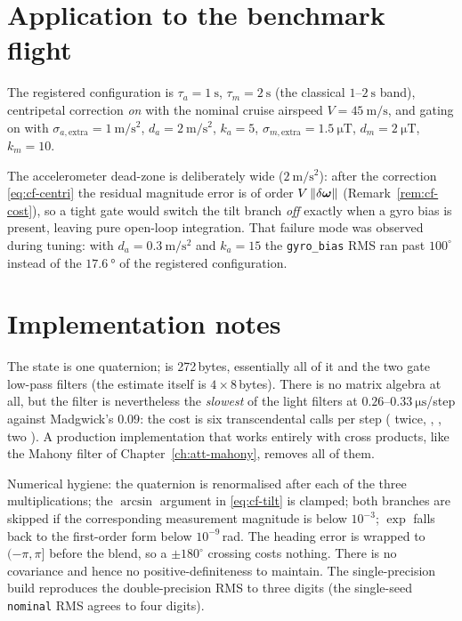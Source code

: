 \section{Application to the benchmark flight}
The registered configuration is $\tau_a=\SI{1}{\second}$, $\tau_m=\SI{2}{\second}$ (the classical
$1$--$\SI{2}{\second}$ band), centripetal correction \emph{on} with the nominal cruise airspeed
$V=\SI{45}{\metre\per\second}$, and gating on with
$\sigma_{a,\text{extra}}=\SI{1}{\metre\per\second\squared}$, $d_a=\SI{2}{\metre\per\second\squared}$,
$k_a=5$, $\sigma_{m,\text{extra}}=\SI{1.5}{\micro\tesla}$, $d_m=\SI{2}{\micro\tesla}$, $k_m=10$.

The accelerometer dead-zone is deliberately wide ($\SI{2}{\metre\per\second\squared}$): after the
correction \eqref{eq:cf-centri} the residual magnitude error is of order $V\left\lVert \delta\bm{\omega} \right\rVert$
(Remark~\ref{rem:cf-cost}), so a tight gate would switch the tilt branch \emph{off} exactly when a
gyro bias is present, leaving pure open-loop integration. That failure mode was observed during
tuning: with $d_a=\SI{0.3}{\metre\per\second\squared}$ and $k_a=15$ the \texttt{gyro\_bias} RMS ran
past $100^\circ$ instead of the $\SI{17.6}{\degree}$ of the registered configuration.

\section{Implementation notes}
The state is one quaternion;  is 272\,bytes, essentially all of it  and
the two gate low-pass filters (the estimate itself is $4\times8$\,bytes). There is no matrix algebra
at all, but the filter is nevertheless the \emph{slowest} of the light filters at
$0.26$--$\SI{0.33}{\micro\second}$/step against Madgwick's $0.09$: the cost is six transcendental
calls per step ( twice, , , two ). A
production implementation that works entirely with cross products, like the Mahony filter of
Chapter~\ref{ch:att-mahony}, removes all of them.

Numerical hygiene: the quaternion is renormalised after each of the three multiplications; the
$\arcsin$ argument in \eqref{eq:cf-tilt} is clamped; both branches are skipped if the corresponding
measurement magnitude is below $10^{-3}$; $\exp$ falls back to the first-order form below
$10^{-9}$\,rad. The heading error is wrapped to $(-\pi,\pi]$ before the blend, so a
$\pm180^\circ$ crossing costs nothing. There is no covariance and hence no positive-definiteness to
maintain. The single-precision build reproduces the double-precision RMS to three digits
(the single-seed \texttt{nominal} RMS agrees to four digits).

